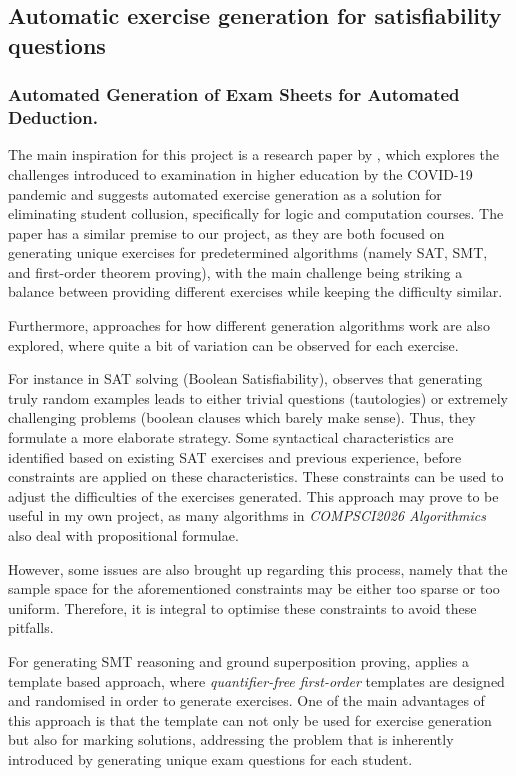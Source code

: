 \documentclass{l4proj}
\begin{document}
\subsection{Automatic exercise generation for satisfiability questions}
\subsubsection{Automated Generation of Exam Sheets for Automated Deduction.}

The main inspiration for this project is a research paper by \citet{Hoz21}, which explores the challenges introduced to examination in higher education by the COVID-19 pandemic and suggests automated exercise generation as a solution for eliminating student collusion, specifically for logic and computation courses. The paper has a similar premise to our project, as they are both focused on generating unique exercises for predetermined algorithms (namely SAT, SMT, and first-order theorem proving), with the main challenge being striking a balance between providing different exercises while keeping the difficulty similar. 

Furthermore, approaches for how different generation algorithms work are also explored, where quite a bit of variation can be observed for each exercise. 

For instance in SAT solving (Boolean Satisfiability), \citet{Hoz21} observes that generating truly random examples leads to either trivial questions (tautologies) or extremely challenging problems (boolean clauses which barely make sense). Thus, they formulate a more elaborate strategy. Some syntactical characteristics are identified based on existing SAT exercises and previous experience, before constraints are applied on these characteristics. These constraints can be used to adjust the difficulties of the exercises generated. This approach may prove to be useful in my own project, as many algorithms in \emph{COMPSCI2026 Algorithmics} also deal with propositional formulae. 

However, some issues are also brought up regarding this process, namely that the sample space for the aforementioned constraints may be either too sparse or too uniform. Therefore, it is integral to optimise these constraints to avoid these pitfalls. 

For generating SMT reasoning and ground superposition proving, \citet{Hoz21} applies a template based approach, where \emph{quantifier-free first-order} templates are designed and randomised in order to generate exercises. One of the main advantages of this approach is that the template can not only be used for exercise generation but also for marking solutions, addressing the problem that is inherently introduced by generating unique exam questions for each student. 
\end{document}
